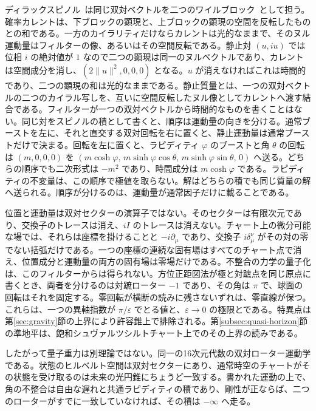 \documentclass[a4paper]{article}
\begin{document}
ディラックスピノル~\cite{dirac1928}は同じ双対ベクトルを二つのワイルブロック~\cite{weyl1929}として担う。確率カレントは、下ブロックの顕現と、上ブロックの顕現の空間を反転したものとの和である。一方のカイラリティだけならカレントは光的なままで、そのヌル運動量はフィルターの像、あるいはその空間反転である。静止対 \((u,iu)\) では位相 \(i\) の絶対値が \(1\) なので二つの顕現は同一のヌルベクトルであり、カレントは空間成分を消し、\((2\lVert u\rVert^2,0,0,0)\) となる。\(u\) が消えなければこれは時間的であり、二つの顕現の和は光的なままである。静止質量とは、一つの双対ベクトルの二つのカイラル写しを、互いに空間反転したヌル像としてカレントへ渡す結合である。フィルターが一つの双対ベクトルから時間的なものを書くことはない。同じ対をスピノルの積として書くと、順序は運動量の向きを分ける。通常ブーストを左に、それと直交する双対回転を右に置くと、静止運動量は通常ブーストだけで決まる。回転を左に置くと、ラピディティ $\varphi$ のブーストと角 $\theta$ の回転は $(m,0,0,0)$ を $(m\cosh\varphi,\, m\sinh\varphi\cos\theta,\, m\sinh\varphi\sin\theta,\, 0)$ へ送る。どちらの順序でも二次形式は $-m^2$ であり、時間成分は $m\cosh\varphi$ である。ラピディティの不変量は、この順序で極値を取らない。解はどちらの積でも同じ質量の解へ送られる。順序が分けるのは、運動量が通常因子だけに載ることである。

位置と運動量は双対セクターの演算子ではない。そのセクターは有限次元であり、交換子のトレースは消え、$iI$ のトレースは消えない。チャート上の微分可能な場では、それらは座標を掛けることと $-i\partial_\mu$ であり、交換子 $i\delta^\nu_\mu$ がその対の零でない括弧だけである。一つの座標の連続な固有場はすべてのチャート点で消え、位置成分と運動量の両方の固有場は零場だけである。不整合の力学の量子化は、このフィルターからは得られない。方位正距図法が極と対蹠点を同じ原点に書くとき、両者を分けるのは対蹠ローター $-1$ であり、その角は $\pi$ で、球面の回転はそれを固定する。零回転が横断の読みに残さないずれは、零直線が保つ。これらは、一つの異軸指数が $\pi/\varepsilon$ でとる値と、$\varepsilon\to 0$ の極限とである。特異点は第\ref{sec:gravity}節の上界により許容錐上で排除される。第\ref{subsec:quasi-horizon}節の準地平は、飽和シュヴァルツシルトチャート上でのその上界の読みである。

したがって量子重力は別理論ではない。同一の16次元代数の双対ローター運動学である。状態のヒルベルト空間は双対セクターにあり、通常時空のチャートがその状態を受け取るのは未来の光円錐にちょうど一致する。書かれた運動の上で、角の不整合は自由な遅れと共通ラピディティの積であり、剛性が正ならば、二つのローターがすでに一致していなければ、その積は $-\infty$ へ走る。
\end{document}
